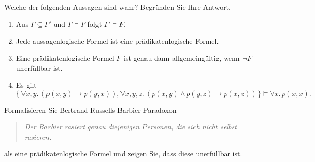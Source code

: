 \documentclass[german]{latteachCD}[2017/03/28]
\begin{document}
\begin{exercise}
  Welche der folgenden Aussagen sind wahr?  Begründen Sie Ihre Antwort.
  \begin{enumerate}
  \item Aus $\Gamma \subseteq \Gamma'$ und $\Gamma \models F$ folgt $\Gamma'
    \models F$.
  \item Jede aussagenlogische Formel ist eine prädikatenlogische Formel.
  \item Eine prädikatenlogische Formel $F$ ist genau dann allgemeingültig,
    wenn $\lnot F$ unerfüllbar ist.
  \item Es gilt
    \begin{equation*}
      \{\,\forall x, y.\, (p(x,y) \to p(y,x)), \forall x, y, z.\, (p(x,y) \land p(y,z)
      \to p(x,z))\,\} \models \forall x.\, p(x,x).
    \end{equation*}
  \end{enumerate}
\end{exercise}

\begin{exercise}
  Formalisieren Sie Bertrand Russells Barbier-Paradoxon
  \begin{quote}
    \emph{Der Barbier rasiert genau diejenigen Personen, die sich nicht selbst rasieren.}
  \end{quote}
  als eine prädikatenlogische Formel und zeigen Sie, dass diese unerfüllbar ist.
\end{exercise}
\end{document}
